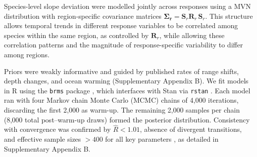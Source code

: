 \documentclass[9pt,twocolumn,twoside]{pnas-new}
\begin{document}
{Species-level slope deviation were modelled jointly across responses using a MVN distribution with region-specific covariance matrices $\boldsymbol{\Sigma_r} = \mathbf{S}_{r}\mathbf{R}_{r}\,\mathbf{S}_{r}$. This structure allows temporal trends in different response variables to be correlated among species within the same region, as controlled by $\mathbf{R}_{r}$, while allowing these correlation patterns and the magnitude of response-specific variability to differ among regions.

Priors were weakly informative and guided by published rates of range shifts, depth changes, and ocean warming (Supplementary Appendix B). We fit models in R using the \texttt{brms} package \citep{burkner_brms_2017}, which interfaces with Stan via \texttt{rstan} \citep{stan2024,stan_development_team_rstan_2024}. Each model ran with four Markov chain Monte Carlo (MCMC) chains of 4,000 iterations, discarding the first 2,000 as warm-up. The remaining 2,000 samples per chain (8,000 total post–warm-up draws) formed the posterior distribution. Consistency with convergence was confirmed by $\hat{R} < 1.01$, absence of divergent transitions, and effective sample sizes $> 400$ for all key parameters \citep{vehtari_rank-normalization_2021}, as detailed in Supplementary Appendix B.

}

\showmatmethods{} %



\showacknow{} %



\bibsplit[22]


\end{document}
